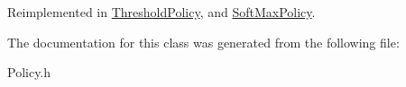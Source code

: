 Reimplemented in \mbox{\hyperlink{class_threshold_policy_a9f8e4051589b915971ffc647ba7fe623}{Threshold\+Policy}}, and \mbox{\hyperlink{class_soft_max_policy_a425d8bb5f2f504f2d7de8576f0e3f81f}{Soft\+Max\+Policy}}.



The documentation for this class was generated from the following file\+:\begin{DoxyCompactItemize}
\item 
Policy.\+h\end{DoxyCompactItemize}
